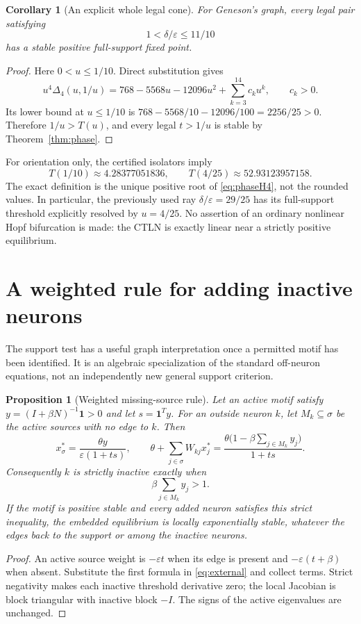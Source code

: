 \documentclass[11pt,a4paper]{article}
\newtheorem{proposition}[theorem]{Proposition}
\newtheorem{corollary}[theorem]{Corollary}
\theoremstyle{definition}\newtheorem{definition}[theorem]{Definition}
\theoremstyle{remark}\newtheorem{remark}[theorem]{Remark}
\newcommand{\ones}{\mathbf{1}}
\newcommand{\eps}{\varepsilon}
\begin{document}
\begin{corollary}[An explicit whole legal cone]\label{cor:cone}
For Geneson's graph, every legal pair satisfying
\[
 1<\delta/\eps\leq11/10
\]
has a stable positive full-support fixed point.
\end{corollary}
\begin{proof}
Here $0<u\leq1/10$. Direct substitution gives
\[
 u^4\Delta_4(u,1/u)=768-5568u-12096u^2+\sum_{k=3}^{14}c_ku^k,
 \qquad c_k>0.
\]
Its lower bound at $u\leq1/10$ is
$768-5568/10-12096/100=2256/25>0$.
Therefore $1/u>T(u)$, and every legal $t>1/u$ is stable by Theorem~\ref{thm:phase}.
\end{proof}

For orientation only, the certified isolators imply
\[
 T(1/10)\approx4.28377051836,\qquad T(4/25)\approx52.93123957158.
\]
The exact definition is the unique positive root of \eqref{eq:phaseH4}, not the rounded values. In particular, the previously used ray $\delta/\eps=29/25$ has its full-support threshold explicitly resolved by $u=4/25$. No assertion of an ordinary nonlinear Hopf bifurcation is made: the CTLN is exactly linear near a strictly positive equilibrium.

\section{A weighted rule for adding inactive neurons}\label{sec:external}
The support test has a useful graph interpretation once a permitted motif has been identified. It is an algebraic specialization of the standard off-neuron equations, not an independently new general support criterion.

\begin{proposition}[Weighted missing-source rule]\label{prop:external}
Let an active motif satisfy $y=(I+\beta N)^{-1}\ones>0$ and let $s=\ones^Ty$. For an outside neuron $k$, let $M_k\subseteq\sigma$ be the active sources with no edge to $k$. Then
\begin{equation}\label{eq:external}
 x^*_\sigma=\frac{\theta y}{\eps(1+ts)},\qquad
 \theta+\sum_{j\in\sigma}W_{kj}x_j^*
 =\frac{\theta\bigl(1-\beta\sum_{j\in M_k}y_j\bigr)}{1+ts}.
\end{equation}
Consequently $k$ is strictly inactive exactly when
\begin{equation}\label{eq:weighted}
 \beta\sum_{j\in M_k}y_j>1.
\end{equation}
If the motif is positive stable and every added neuron satisfies this strict inequality, the embedded equilibrium is locally exponentially stable, whatever the edges back to the support or among the inactive neurons.
\end{proposition}
\begin{proof}
An active source weight is $-\eps t$ when its edge is present and $-\eps(t+\beta)$ when absent. Substitute the first formula in \eqref{eq:external} and collect terms. Strict negativity makes each inactive threshold derivative zero; the local Jacobian is block triangular with inactive block $-I$. The signs of the active eigenvalues are unchanged.
\end{proof}
\end{document}
